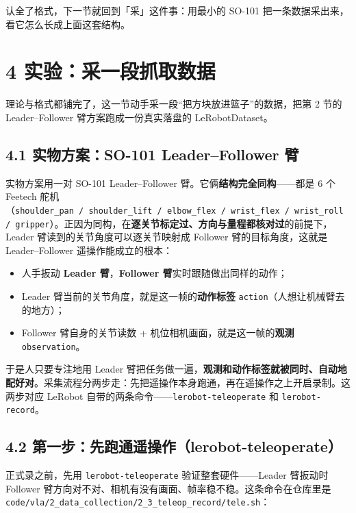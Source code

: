 \documentclass[
  chinese,
]{ctexart}
\providecommand{\tightlist}{%
  \setlength{\itemsep}{0pt}\setlength{\parskip}{0pt}}
\begin{document}
认全了格式，下一节就回到「采」这件事：用最小的 SO-101
把一条数据采出来，看它怎么长成上面这套结构。

\section{4
实验：采一段抓取数据}\label{ux5b9eux9a8cux91c7ux4e00ux6bb5ux6293ux53d6ux6570ux636e}

理论与格式都铺完了，这一节动手采一段``把方块放进篮子''的数据，把第 2
节的 Leader--Follower 臂方案跑成一份真实落盘的 LeRobotDataset。

\subsection{4.1 实物方案：SO-101 Leader--Follower
臂}\label{ux5b9eux7269ux65b9ux6848so-101-leaderfollower-ux81c2}

实物方案用一对 SO-101 Leader--Follower
臂。它俩\textbf{结构完全同构}------都是 6 个 Feetech
舵机（\texttt{shoulder\_pan\ /\ shoulder\_lift\ /\ elbow\_flex\ /\ wrist\_flex\ /\ wrist\_roll\ /\ gripper}）。正因为同构，在\textbf{逐关节标定过、方向与量程都核对过}的前提下，Leader
臂读到的关节角度可以逐关节映射成 Follower 臂的目标角度，这就是
Leader--Follower 遥操作能成立的根本：

\begin{itemize}
\tightlist
\item
  人手扳动 \textbf{Leader 臂}，\textbf{Follower
  臂}实时跟随做出同样的动作；
\item
  Leader 臂当前的关节角度，就是这一帧的\textbf{动作标签}
  \texttt{action}（人想让机械臂去的地方）；
\item
  Follower 臂自身的关节读数 + 机位相机画面，就是这一帧的\textbf{观测}
  \texttt{observation}。
\end{itemize}

于是人只要专注地用 Leader
臂把任务做一遍，\textbf{观测和动作标签就被同时、自动地配好对}。采集流程分两步走：先把遥操作本身跑通，再在遥操作之上开启录制。这两步对应
LeRobot 自带的两条命令------\texttt{lerobot-teleoperate} 和
\texttt{lerobot-record}。

\subsection{4.2
第一步：先跑通遥操作（lerobot-teleoperate）}\label{ux7b2cux4e00ux6b65ux5148ux8dd1ux901aux9065ux64cdux4f5clerobot-teleoperate}

正式录之前，先用 \texttt{lerobot-teleoperate} 验证整套硬件------Leader
臂扳动时 Follower
臂方向对不对、相机有没有画面、帧率稳不稳。这条命令在仓库里是
\texttt{code/vla/2\_data\_collection/2\_3\_teleop\_record/tele.sh}：
\end{document}
